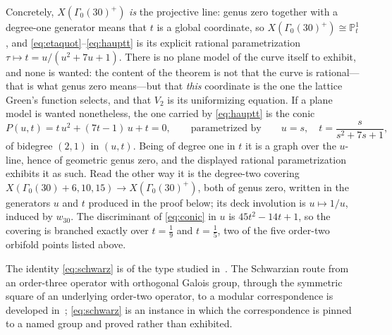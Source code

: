\documentclass[11pt]{article}
\theoremstyle{plain}
\theoremstyle{remark}
\begin{document}
Concretely, $X(\Gamma_0(30)^+)$ \emph{is} the projective line: genus zero together with a
degree-one generator means that $t$ is a global coordinate, so
$X(\Gamma_0(30)^+)\cong\mathbb{P}^1_t$, and \eqref{eq:etaquot}--\eqref{eq:hauptt} is its explicit
rational parametrization $\tau\mapsto t=u/(u^2+7u+1)$. There is no plane model of the curve itself
to exhibit, and none is wanted: the content of the theorem is not that the curve is
rational---that is what genus zero means---but that \emph{this} coordinate is the one the lattice
Green's function selects, and that $V_2$ is its uniformizing equation. If a plane model is wanted
nonetheless, the one carried by \eqref{eq:hauptt} is the conic
\begin{equation}
P(u,t)=t\,u^{2}+(7t-1)\,u+t=0,
\qquad\text{parametrized by}\qquad
u=s,\quad t=\frac{s}{s^{2}+7s+1},
\label{eq:conic}
\end{equation}
of bidegree $(2,1)$ in $(u,t)$. Being of degree one in $t$ it is a graph over the $u$-line, hence
of geometric genus zero, and the displayed rational parametrization exhibits it as such. Read the
other way it is the degree-two covering
$X(\Gamma_0(30){+}6,10,15)\to X(\Gamma_0(30)^+)$, both of genus zero, written in the generators
$u$ and $t$ produced in the proof below; its deck involution is $u\mapsto1/u$, induced by
$w_{30}$. The discriminant of \eqref{eq:conic} in $u$ is $45t^2-14t+1$, so the covering is
branched exactly over $t=\tfrac19$ and $t=\tfrac15$, two of the five order-two orbifold points
listed above.

The identity \eqref{eq:schwarz} is of the type
studied in~\cite{AbdelazizMaillard2017,AbdelazizMaillard2017b}. The Schwarzian route from an
order-three operator with orthogonal Galois group, through the symmetric square of an underlying
order-two operator, to a modular correspondence is developed
in~\cite{AbdelazizMaillard2017,AbdelazizMaillard2017b}; \eqref{eq:schwarz} is an instance in
which the correspondence is pinned to a named group and proved rather than exhibited.
\end{document}
